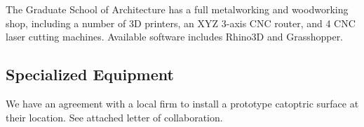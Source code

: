 \documentclass[11pt]{article}
\begin{document}
\vspace{0.1in}
\noindent
The Graduate School of Architecture has a full metalworking and woodworking
shop, including a number of 3D printers, an XYZ 3-axis CNC router,
and 4 CNC laser cutting machines.  Available software
includes Rhino3D and Grasshopper.

\subsection*{Specialized Equipment}

We have an agreement with a local firm to install a prototype catoptric
surface at their location.  See attached letter of collaboration.
\end{document}
